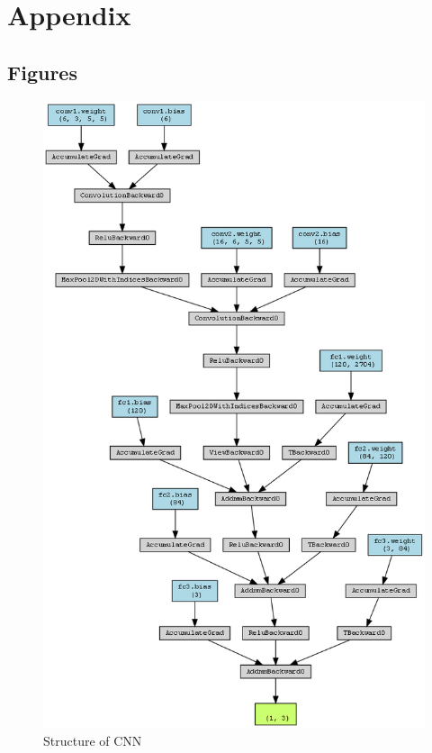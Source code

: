 \documentclass[
  11pt,
]{article}
\begin{document}



\newpage

\hypertarget{appendix}{%
\section{Appendix}\label{appendix}}

\hypertarget{figures}{%
\subsection{Figures}\label{figures}}

\begin{figure}
\centering
\begin{minipage}{0.45\textwidth}
\centering
\includegraphics[width=\linewidth]{./data/simple_cnn_visualization.png}
\caption{Structure of CNN}
\label{fig:cnn}
\end{minipage}
\end{figure}
\end{document}
